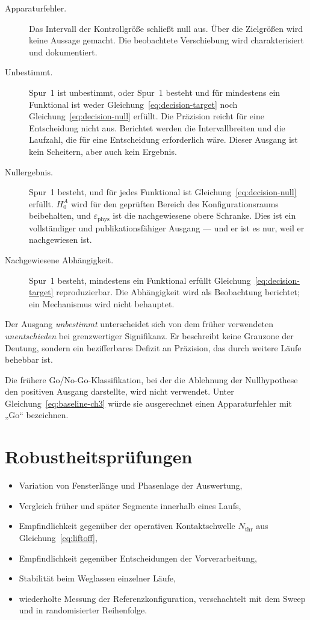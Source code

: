 \documentclass[12pt,a4paper]{report}
\begin{document}
\begin{description}
  \item[Apparaturfehler.] Das Intervall der Kontrollgröße schließt null
        aus. Über die Zielgrößen wird keine Aussage gemacht. Die
        beobachtete Verschiebung wird charakterisiert und dokumentiert.
  \item[Unbestimmt.] Spur~1 ist unbestimmt, oder Spur~1 besteht und für
        mindestens ein Funktional ist weder
        Gleichung~\eqref{eq:decision-target} noch
        Gleichung~\eqref{eq:decision-null} erfüllt. Die Präzision reicht
        für eine Entscheidung nicht aus. Berichtet werden die
        Intervallbreiten und die Laufzahl, die für eine Entscheidung
        erforderlich wäre. Dieser Ausgang ist kein Scheitern, aber auch
        kein Ergebnis.
  \item[Nullergebnis.] Spur~1 besteht, und für jedes Funktional ist
        Gleichung~\eqref{eq:decision-null} erfüllt. $H_{0}^{A}$ wird für
        den geprüften Bereich des Konfigurationsraums beibehalten, und
        $\varepsilon_{\mathrm{phys}}$ ist die nachgewiesene obere
        Schranke. Dies ist ein vollständiger und publikationsfähiger
        Ausgang --- und er ist es nur, weil er nachgewiesen ist.
  \item[Nachgewiesene Abhängigkeit.] Spur~1 besteht, mindestens ein
        Funktional erfüllt Gleichung~\eqref{eq:decision-target}
        reproduzierbar. Die Abhängigkeit wird als Beobachtung berichtet;
        ein Mechanismus wird nicht behauptet.
\end{description}

Der Ausgang \emph{unbestimmt} unterscheidet sich von dem früher
verwendeten \emph{unentschieden} bei grenzwertiger Signifikanz. Er
beschreibt keine Grauzone der Deutung, sondern ein bezifferbares
Defizit an Präzision, das durch weitere Läufe behebbar ist.

Die frühere Go/No-Go-Klassifikation, bei der die Ablehnung der
Nullhypothese den positiven Ausgang darstellte, wird nicht verwendet.
Unter Gleichung~\eqref{eq:baseline-ch3} würde sie ausgerechnet einen
Apparaturfehler mit „Go“ bezeichnen.

\section{Robustheitsprüfungen}

\begin{itemize}
  \item Variation von Fensterlänge und Phasenlage der Auswertung,
  \item Vergleich früher und später Segmente innerhalb eines Laufs,
  \item Empfindlichkeit gegenüber der operativen Kontaktschwelle
        $N_{\mathrm{thr}}$ aus Gleichung~\eqref{eq:liftoff},
  \item Empfindlichkeit gegenüber Entscheidungen der Vorverarbeitung,
  \item Stabilität beim Weglassen einzelner Läufe,
  \item wiederholte Messung der Referenzkonfiguration, verschachtelt mit
        dem Sweep und in randomisierter Reihenfolge.
\end{itemize}
\end{document}
